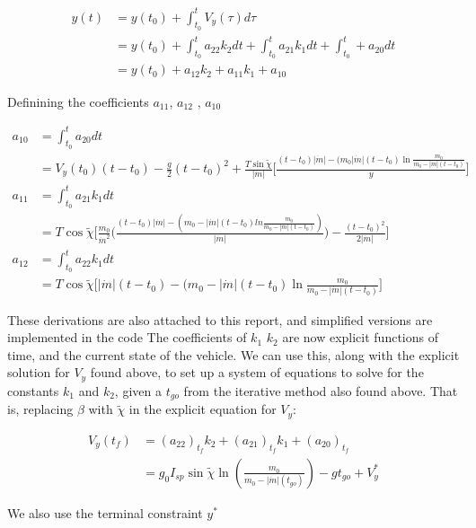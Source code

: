 \documentclass{article}
\begin{document}
\begin{align*}
y(t) &= y(t_0) + \int_{t_0}^tV_y(\tau)d\tau \\ 
&= y(t_0) + \int_{t_0}^ta_{22}k_2 dt + \int_{t_0}^ta_{21}k_1 dt + \int_{t_0}^t +a_{20}dt \\
&= y(t_0) +a_{12}k_2 + a_{11}k_1 + a_{10}
\end{align*}

Definining the coefficients $a_{11}$, $a_{12}$ , $a_{10}$

\begin{align*}
a_{10} &= \int_{t_0}^t a_{20}dt \\ 
&= V_y(t_0)(t-t_0) - \frac{g}{2}(t-t_0)^2 + \frac{T\sin\tilde\chi}{|\dot{m}|}\Big[\frac{(t-t_0)|\dot{m}| - (m_0|\dot{m}|(t-t_0)\ln{\frac{m_0}{m_0 - |\dot{m}|(t-t_0)}}}{y} \Big] \\
a_{11} &= \int_{t_0}^t a_{21}k_1 dt \\ 
&= T\cos\tilde\chi\Big[\frac{m_0}{\dot{m}^2} \Big(\frac{(t-t_0)|\dot{m}| - (m_0 - |\dot{m}|(t-t_0)ln\frac{m_0}{m_0 - |\dot{m}|(t-t_0)} )}{|\dot{m}|}\Big) - \frac{(t-t_0)^2}{2|\dot{m}|}\Big]\\
a_{12} &= \int_{t_0}^t a_{22}k_1 dt\\
&= T\cos{\tilde\chi}\Big[|\dot{m}|(t-t_0) - (m_0 - |\dot{m}|(t-t_0)\ln{\frac{m_0}{m_0 - |\dot{m}|(t-t_0)}}\Big]
\end{align*}

These derivations are also attached to this report, and simplified versions are implemented in the code \newline
The coefficients of $k_1$ $k_2$ are now explicit functions of time, and the current state of the vehicle. We can use this, along with the explicit solution for $V_y$ found above, 
to set up a system of equations to solve for the constants $k_1$ and $k_2$, given a $t_{go}$ from the iterative method also found above. \newline
That is, replacing $\beta$ with $\tilde\chi$ in the explicit equation for $V_y$:

\begin{align*}
V_y(t_f) &= \left (a_{22}  \right )_{t_f} k_2 +\left (a_{21}  \right )_{t_f} k_1 + \left (a_{20}  \right )_{t_f} \\
&= g_0I_{sp}\sin\tilde\chi\ln\left(\frac{m_0}{m_0 - |\dot{m}|(t_{go})}\right)  - gt_{go}+ V_y^*
\end{align*}

We also use the terminal constraint $y^*$
\end{document}
